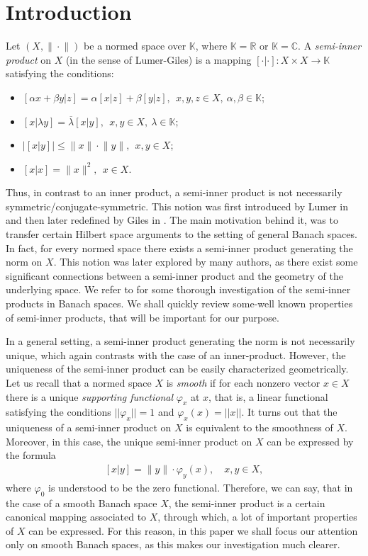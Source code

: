 \documentclass[12pt, reqno]{amsart}
\theoremstyle{definition}
\theoremstyle{remark}
\numberwithin{equation}{section}
\newcommand{\R}{\mbox{$\mathbb{R}$}}
\newcommand{\C}{\mbox{$\mathbb{C}$}}
\newcommand{\K}{\mbox{$\mathbb{K}$}}
\newcommand{\sip}[2]{\left[#1|#2\right]}
\begin{document}
\section{Introduction}
Let $(X, \|\!\cdot\!\|)$ be a normed space over $\K$, where $\K=\R$ or $\K=\C$. A \emph{semi-inner product} on $X$ (in the sense of Lumer-Giles) is a mapping
$\sip{\cdot}{\cdot}\colon X\times X\to \K$ satisfying the conditions:
\begin{itemize}
\item[(sip1)] $\sip{\alpha x+\beta
y}{z}=\alpha\sip{x}{z}+{\beta}\sip{y}{z},\ \ x,y,z\in X,\
\alpha,\beta\in\K$;
\item[(sip2)] $\sip{x}{\lambda
y}=\overline{\lambda}\sip{x}{y},\ \ x,y\in X,\ \lambda\in\K$;
\item[(sip3)] $\big|\sip{x}{y}\big|\leq\|x\|\!\cdot\!\|y\|,\ \ x,y\in X$;
\item[(sip4)] $\sip{x}{x}=\|x\|^2,\ \ x\in X$.
\end{itemize}
Thus, in contrast to an inner product, a semi-inner product is not necessarily symmetric/conjugate-symmetric. This notion was first introduced by Lumer in \cite{lumer} and then later redefined by Giles in \cite{giles}. The main motivation behind it, was to transfer certain Hilbert space arguments to the setting of general Banach spaces. In fact, for every normed space there exists a semi-inner product generating the norm on $X$. This notion was later explored by many authors, as there exist some significant connections between a semi-inner product and the geometry of the underlying space. We refer to \cite{dragomir-sip} for some thorough investigation of the semi-inner products in Banach spaces. We shall quickly review some-well known properties of semi-inner products, that will be important for our purpose.

In a general setting, a semi-inner product generating the norm is not necessarily unique, which again contrasts with the case of an inner-product. However, the uniqueness of the semi-inner product can be easily characterized geometrically. Let us recall that a normed space $X$ is \emph{smooth} if for each nonzero vector $x \in X$ there is a unique \emph{supporting functional} $\varphi_x$ at $x$, that is, a linear functional satisfying the conditions $||\varphi_x||=1$ and $\varphi_x(x)=||x||$. It turns out that the uniqueness of a semi-inner product on $X$ is equivalent to the smoothness of $X$. Moreover, in this case, the unique semi-inner product on $X$ can be expressed by the formula
\begin{align}\label{sip-pattern-in-smooth-sp}
\sip{x}{y}=\|y\|\!\cdot\!\varphi_y(x),\quad x,y\in X,
\end{align}
where $\varphi_0$ is understood to be the zero functional. Therefore, we can say, that in the case of a smooth Banach space $X$, the semi-inner product is a certain canonical mapping associated to $X$, through which, a lot of important properties of $X$ can be expressed. For this reason, in this paper we shall focus our attention only on smooth Banach spaces, as this makes our investigation much clearer.
\end{document}
